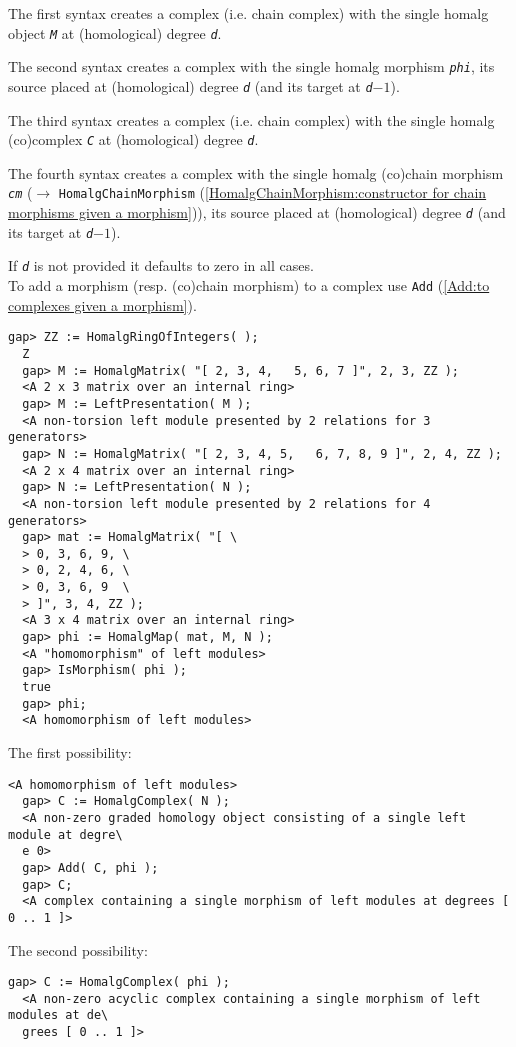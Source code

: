 \documentclass[a4paper,11pt]{report}
\begin{document}
{{{ The first syntax creates a complex (i.e. chain complex) with the single \textsf{homalg} object \mbox{\texttt{\slshape M}} at (homological) degree \mbox{\texttt{\slshape d}}. 

 The second syntax creates a complex with the single \textsf{homalg} morphism \mbox{\texttt{\slshape phi}}, its source placed at (homological) degree \mbox{\texttt{\slshape d}} (and its target at \mbox{\texttt{\slshape d}}$-1$). 

 The third syntax creates a complex (i.e. chain complex) with the single \textsf{homalg} (co)complex \mbox{\texttt{\slshape C}} at (homological) degree \mbox{\texttt{\slshape d}}. 

 The fourth syntax creates a complex with the single \textsf{homalg} (co)chain morphism \mbox{\texttt{\slshape cm}} ($\to$ \texttt{HomalgChainMorphism} (\ref{HomalgChainMorphism:constructor for chain morphisms given a morphism})), its source placed at (homological) degree \mbox{\texttt{\slshape d}} (and its target at \mbox{\texttt{\slshape d}}$-1$). 

 If \mbox{\texttt{\slshape d}} is not provided it defaults to zero in all cases. \\
 To add a morphism (resp. (co)chain morphism) to a complex use \texttt{Add} (\ref{Add:to complexes given a morphism}). 
\begin{Verbatim}[fontsize=\small,frame=single,label=Example]
  gap> ZZ := HomalgRingOfIntegers( );
  Z
  gap> M := HomalgMatrix( "[ 2, 3, 4,   5, 6, 7 ]", 2, 3, ZZ );
  <A 2 x 3 matrix over an internal ring>
  gap> M := LeftPresentation( M );
  <A non-torsion left module presented by 2 relations for 3 generators>
  gap> N := HomalgMatrix( "[ 2, 3, 4, 5,   6, 7, 8, 9 ]", 2, 4, ZZ );
  <A 2 x 4 matrix over an internal ring>
  gap> N := LeftPresentation( N );
  <A non-torsion left module presented by 2 relations for 4 generators>
  gap> mat := HomalgMatrix( "[ \
  > 0, 3, 6, 9, \
  > 0, 2, 4, 6, \
  > 0, 3, 6, 9  \
  > ]", 3, 4, ZZ );
  <A 3 x 4 matrix over an internal ring>
  gap> phi := HomalgMap( mat, M, N );
  <A "homomorphism" of left modules>
  gap> IsMorphism( phi );
  true
  gap> phi;
  <A homomorphism of left modules>
\end{Verbatim}
 The first possibility: 
\begin{Verbatim}[fontsize=\small,frame=single,label=Example]
  <A homomorphism of left modules>
  gap> C := HomalgComplex( N );
  <A non-zero graded homology object consisting of a single left module at degre\
  e 0>
  gap> Add( C, phi );
  gap> C;
  <A complex containing a single morphism of left modules at degrees [ 0 .. 1 ]>
\end{Verbatim}
 The second possibility: 
\begin{Verbatim}[fontsize=\small,frame=single,label=Example]
  gap> C := HomalgComplex( phi );
  <A non-zero acyclic complex containing a single morphism of left modules at de\
  grees [ 0 .. 1 ]>
\end{Verbatim}
 }

}}
\end{document}
